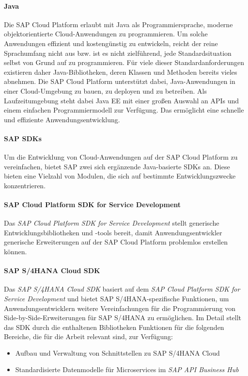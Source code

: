 \paragraph{Java}
Die SAP Cloud Platform erlaubt mit Java als Programmiersprache, moderne objektorientierte Cloud-Anwendungen zu programmieren. Um solche Anwendungen effizient und kostengünstig zu entwickeln, reicht der reine Sprachumfang nicht aus bzw. ist es nicht zielführend, jede Standardsituation selbst von Grund auf zu programmieren. Für viele dieser Standardanforderungen existieren daher Java-Bibliotheken, deren Klassen und Methoden bereits vieles abnehmen. Die SAP Cloud Platform unterstützt dabei, Java-Anwendungen in einer Cloud-Umgebung zu bauen, zu deployen und zu betreiben. Als Laufzeitumgebung steht dabei \ac{Java EE} mit einer großen Auswahl an APIs und einem einfachen Programmiermodell zur Verfügung. Das ermöglicht eine schnelle und effiziente Anwendungsentwicklung. 

\paragraph{SAP \ac{SDK}s}
Um die Entwicklung von Cloud-Anwendungen auf der SAP Cloud Platform zu vereinfachen, bietet SAP zwei sich ergänzende Java-basierte \ac{SDK}s an. Diese bieten eine Vielzahl von Modulen, die sich auf bestimmte Entwicklungszwecke konzentrieren.

\paragraph{SAP Cloud Platform SDK for Service Development}
Das \textit{SAP Cloud Platform SDK for Service Development} stellt generische Entwicklungsbibliotheken und -tools bereit, damit Anwendungsentwickler generische Erweiterungen auf der SAP Cloud Platform problemlos erstellen können.

\paragraph{SAP S/4HANA Cloud SDK}
Das \textit{SAP S/4HANA Cloud SDK} basiert auf dem \textit{SAP Cloud Platform SDK for Service Development} und bietet SAP S/4HANA-spezifische Funktionen, um Anwendungsentwicklern weitere Vereinfachungen für die Programmierung von Side-by-Side-Erweiterungen für SAP S/4HANA zu ermöglichen. Im Detail stellt das SDK durch die enthaltenen Bibliotheken Funktionen für die folgenden Bereiche, die für die Arbeit relevant sind, zur Verfügung:
\begin{itemize}
    \item Aufbau und Verwaltung von Schnittstellen zu SAP S/4HANA Cloud
    \item Standardisierte Datenmodelle für Microservices im \textit{SAP API Business Hub}
\end{itemize}

